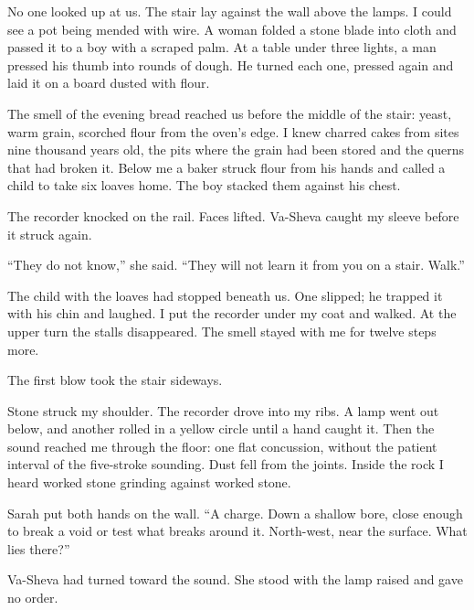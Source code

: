 No one looked up at us. The stair lay against the wall above the lamps. I could see a pot being mended with wire. A woman folded a stone blade into cloth and passed it to a boy with a scraped palm. At a table under three lights, a man pressed his thumb into rounds of dough. He turned each one, pressed again and laid it on a board dusted with flour.\par

The smell of the evening bread reached us before the middle of the stair: yeast, warm grain, scorched flour from the oven's edge. I knew charred cakes from sites nine thousand years old, the pits where the grain had been stored and the querns that had broken it. Below me a baker struck flour from his hands and called a child to take six loaves home. The boy stacked them against his chest.\par

The recorder knocked on the rail. Faces lifted. Va-Sheva caught my sleeve before it struck again.\par

``They do not know,'' she said. ``They will not learn it from you on a stair. Walk.''\par

The child with the loaves had stopped beneath us. One slipped; he trapped it with his chin and laughed. I put the recorder under my coat and walked. At the upper turn the stalls disappeared. The smell stayed with me for twelve steps more.\par

\ornament

The first blow took the stair sideways.\par

Stone struck my shoulder. The recorder drove into my ribs. A lamp went out below, and another rolled in a yellow circle until a hand caught it. Then the sound reached me through the floor: one flat concussion, without the patient interval of the five-stroke sounding. Dust fell from the joints. Inside the rock I heard worked stone grinding against worked stone.\par

Sarah put both hands on the wall. ``A charge. Down a shallow bore, close enough to break a void or test what breaks around it. North-west, near the surface. What lies there?''\par

Va-Sheva had turned toward the sound. She stood with the lamp raised and gave no order.\par

